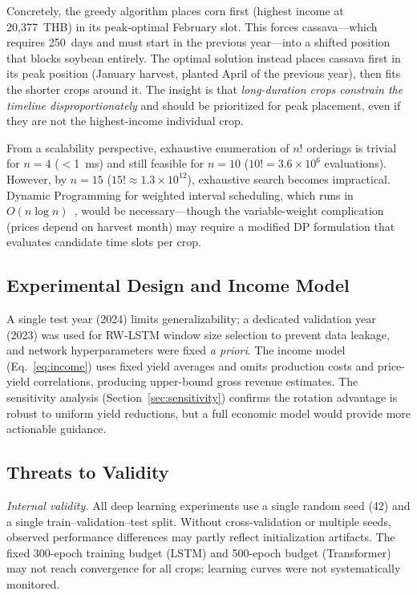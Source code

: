 \documentclass[journal]{IEEEtran}
\begin{document}
Concretely, the greedy algorithm places corn first (highest income at 20,377~THB) in its peak-optimal February slot. This forces cassava---which requires 250~days and must start in the previous year---into a shifted position that blocks soybean entirely. The optimal solution instead places cassava first in its peak position (January harvest, planted April of the previous year), then fits the shorter crops around it. The insight is that \textit{long-duration crops constrain the timeline disproportionately} and should be prioritized for peak placement, even if they are not the highest-income individual crop.

From a scalability perspective, exhaustive enumeration of $n!$ orderings is trivial for $n = 4$ ($<$1~ms) and still feasible for $n = 10$ ($10! = 3.6 \times 10^6$ evaluations). However, by $n = 15$ ($15! \approx 1.3 \times 10^{12}$), exhaustive search becomes impractical. Dynamic Programming for weighted interval scheduling, which runs in $O(n \log n)$~\cite{kleinberg2005}, would be necessary---though the variable-weight complication (prices depend on harvest month) may require a modified DP formulation that evaluates candidate time slots per crop.

\subsection{Experimental Design and Income Model}

A single test year (2024) limits generalizability; a dedicated validation year (2023) was used for RW-LSTM window size selection to prevent data leakage, and network hyperparameters were fixed \textit{a priori}. The income model (Eq.~\ref{eq:income}) uses fixed yield averages and omits production costs and price-yield correlations, producing upper-bound gross revenue estimates. The sensitivity analysis (Section~\ref{sec:sensitivity}) confirms the rotation advantage is robust to uniform yield reductions, but a full economic model would provide more actionable guidance.

\subsection{Threats to Validity}

\textit{Internal validity.} All deep learning experiments use a single random seed (42) and a single train--validation--test split. Without cross-validation or multiple seeds, observed performance differences may partly reflect initialization artifacts. The fixed 300-epoch training budget (LSTM) and 500-epoch budget (Transformer) may not reach convergence for all crops; learning curves were not systematically monitored.
\end{document}
